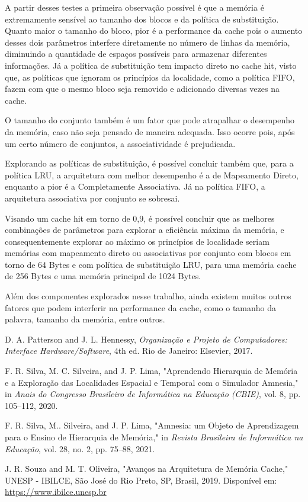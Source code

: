 \documentclass[conference]{IEEEtran}
\begin{document}
A partir desses testes a primeira observação possível é que a memória é extremamente sensível ao tamanho dos blocos e da política de substituição. Quanto maior o tamanho do bloco, pior é a performance da cache pois o aumento desses dois parâmetros interfere diretamente no número de linhas da memória, diminuindo a quantidade de espaços possíveis para armazenar diferentes informações. Já a política de substituição tem impacto direto no cache hit, visto que, as políticas que ignoram os princípios da localidade, como a política FIFO, fazem com que o mesmo bloco seja removido e adicionado diversas vezes na cache.

O tamanho do conjunto também é um fator que pode atrapalhar o desempenho da memória, caso não seja pensado de maneira adequada. Isso ocorre pois, após um certo número de conjuntos, a associatividade é prejudicada.

Explorando as políticas de substituição, é possível concluir também que, para a política LRU, a arquitetura com melhor desempenho é a de Mapeamento Direto, enquanto a pior é a Completamente Associativa. Já na política FIFO, a arquitetura associativa por conjunto se sobresai.

Visando um cache hit em torno de 0,9, é possível concluir que as melhores combinações de parâmetros para explorar a eficiência máxima da memória, e consequentemente explorar ao máximo os princípios de localidade seriam memórias com mapeamento direto ou associativas por conjunto com blocos em torno de 64 Bytes e com política de substituição LRU, para uma memória cache de 256 Bytes e uma memória principal de 1024 Bytes. 

Além dos componentes explorados nesse trabalho, ainda existem muitos outros fatores que podem interferir na performance da cache, como o tamanho da palavra, tamanho da memória, entre outros.

\begin{thebibliography}{00}

 D. A. Patterson and J. L. Hennessy, \textit{Organização e Projeto de Computadores: Interface Hardware/Software}, 4th ed. Rio de Janeiro: Elsevier, 2017.

 F. R. Silva, M. C. Silveira, and J. P. Lima, "Aprendendo Hierarquia de Memória e a Exploração das Localidades Espacial e Temporal com o Simulador Amnesia," in \textit{Anais do Congresso Brasileiro de Informática na Educação (CBIE)}, vol. 8, pp. 105–112, 2020.

 F. R. Silva, M.. Silveira, and J. P. Lima, "Amnesia: um Objeto de Aprendizagem para o Ensino de Hierarquia de Memória," in \textit{Revista Brasileira de Informática na Educação}, vol. 28, no. 2, pp. 75–88, 2021.

 J. R. Souza and M. T. Oliveira, "Avanços na Arquitetura de Memória Cache," UNESP - IBILCE, São José do Rio Preto, SP, Brasil, 2019. Disponível em: \url{https://www.ibilce.unesp.br}

\end{thebibliography}
\end{document}

